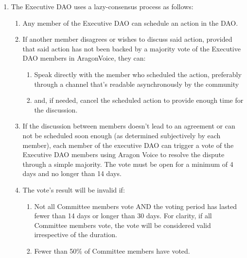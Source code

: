 \begin{enumerate}
\begin{enumerate}
\begin{enumerate}
		\end{enumerate}
	
		\begin{enumerate}
			
			\item The Executive \ac{DAO} uses a lazy-consensus process as follows:
			\begin{enumerate}
				
				\item Any member of the Executive \ac{DAO} can schedule an action in the \ac{DAO}.
				\item If another member disagrees or wishes to discuss said action, provided that said action has not been backed by a majority vote of the Executive \ac{DAO} members in \gls{AragonVoice}, they can:
				\begin{enumerate}
					\item Speak directly with the member who scheduled the action, preferably through a channel that’s readable asynchronously by the community
					\item and, if needed, cancel the scheduled action to provide enough time for the discussion.
				\end{enumerate}
				
				\item If the discussion between members doesn’t lead to an agreement or can not be scheduled soon enough (as determined subjectively by each member), each member of the executive \ac{DAO} can trigger a vote of the Executive \ac{DAO} members using Aragon Voice to resolve the dispute through a simple majority.
				The vote must be open for a minimum of 4 days and no longer than 14 days.
				\item The vote’s result will be invalid if:
				\begin{enumerate}
					\item Not all Committee members vote AND the voting period has lasted fewer than 14 days or longer than 30 days.
					For clarity, if all Committee members vote, the vote will be considered valid irrespective of the duration.
					\item Fewer than 50\% of Committee members have voted.
				\end{enumerate}
			
			\end{enumerate}
		
		\end{enumerate}
	
	\end{enumerate}
	


\end{enumerate}
